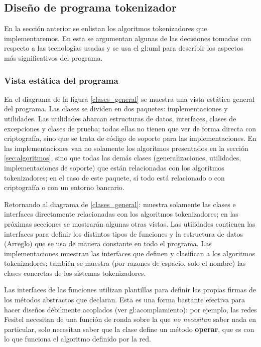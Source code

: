 %
%

\subsection{Diseño de programa tokenizador}

En la sección anterior se enlistan los algoritmos tokenizadores que
implementaremos. En esta se argumentan algunas de las decisiones tomadas
con respecto a las tecnologías usadas y se usa el \gls{gl:uml} para
describir los aspectos más significativos del programa.

\subsubsection{Vista estática del programa}

En el diagrama de la figura \ref{clases_general} se muestra una vista estática
general del programa. Las clases se dividen en dos paquetes: implementaciones
y utilidades. Las utilidades abarcan estructuras de datos, interfaces,
clases de excepciones y clases de prueba; todas ellas no tienen que ver
de forma directa con criptografía, sino que se trata de código de soporte
para las implementaciones. En las implementaciones van no solamente
los algoritmos presentados en la sección \ref{sec:algoritmos}, sino que todas
las demás clases (generalizaciones, utilidades, implementaciones de
soporte) que están relacionadas con los algoritmos tokenizadores; en el caso
de este paquete, sí todo está relacionado o con criptografía o con un
entorno bancario.

Retornando al diagrama de \ref{clases_general}: muestra solamente las clases
e interfaces directamente relacionadas con los algoritmos tokenizadores;
en las próximas secciones se mostrarán algunas otras vistas. Las utilidades
contienen las interfaces para definir los distintos tipos de funciones y la
estructura de datos (Arreglo) que se usa de manera constante en todo el
programa. Las implementaciones muestran las interfaces que definen y clasifican
a los algoritmos tokenizadores; también se muestra (por razones de espacio,
solo el nombre) las clases concretas de los sistemas tokenizadores.

Las interfaces de las funciones utilizan plantillas para definir las propias
firmas de los métodos abstractos que declaran. Esta es una forma bastante
efectiva para hacer diseños débilmente acoplados (ver
\gls{gl:acomplamiento}): por ejemplo, las redes Fesitel necesitan
de una función de ronda sobre la que \textit{no necesitan} saber nada en
particular, solo necesitan saber que la clase define un método \textbf{operar},
que es con lo que funciona el algoritmo definido por la red.

